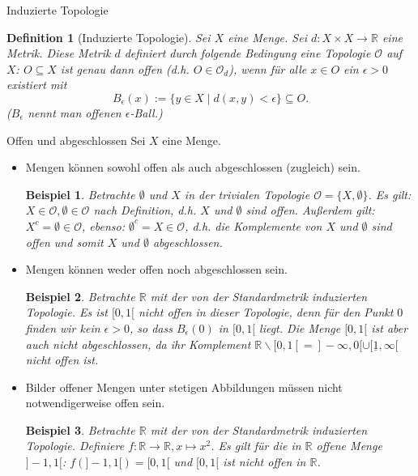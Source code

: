 \documentclass[a4paper,11pt,notitlepage]{report}
\newtheorem{definition}{Definition}[chapter]
\newtheorem{example}{Beispiel}[chapter]
\newcommand{\R}{{\ensuremath{\mathbb{R}}}}
\newcommand{\OO}{{\ensuremath{\mathcal{O}}}}
\begin{document}
\begin{section}{Induzierte Topologie}
	\begin{definition}[Induzierte Topologie]
		Sei $X$ eine Menge. Sei $d \colon X \times X \rightarrow \R$ eine Metrik. Diese Metrik $d$ definiert durch folgende Bedingung eine Topologie $\OO$ auf $X$:
		\newline
		$O \subseteq X$ ist genau dann offen (d.h. $O \in \OO_d$), wenn für alle $x \in O$ ein $\epsilon > 0$ existiert mit
		$$
			B_\epsilon (x) := \{y \in X \mid d(x,y) < \epsilon\} \subseteq O.
		$$
		($B_\epsilon$ nennt man offenen $\epsilon$-Ball.)
	\end{definition}
\end{section}

\begin{section}{Offen und abgeschlossen}
	Sei $X$ eine Menge.
	\begin{itemize}
		\item Mengen können sowohl offen als auch abgeschlossen (zugleich) sein.
			\begin{example}
				Betrachte $\emptyset$ und $X$ in der trivialen Topologie $\OO = \{X, \emptyset\}$.
					\newline
					Es gilt: $X \in \OO, \emptyset \in \OO$ nach Definition, d.h. $X$ und $\emptyset$ sind offen.
					\newline
					Außerdem gilt: $X^c = \emptyset \in \OO$, ebenso: $\emptyset^c = X \in \OO$, d.h. die Komplemente von $X$ und $\emptyset$ sind offen und somit $X$ und $\emptyset$ abgeschlossen.
			\end{example}
			
		\item Mengen können weder offen noch abgeschlossen sein.
			\begin{example}
				Betrachte $\R$ mit der von der Standardmetrik induzierten Topologie. Es ist $[0,1[$ nicht offen in dieser Topologie, denn für den Punkt $0$ finden wir kein $\epsilon > 0$, so dass $B_\epsilon(0)$ in $[0,1[$ liegt.
				Die Menge $[0,1[$ ist aber auch nicht abgeschlossen, da ihr Komplement $\R \backslash [0,1[ = ]-\infty,0[ \cup [\underline{1},\infty[$ nicht offen ist.
			\end{example}
		\item Bilder offener Mengen unter stetigen Abbildungen müssen nicht notwendigerweise offen sein.
			\begin{example}
				Betrachte $\R$ mit der von der Standardmetrik induzierten Topologie.
				\newline
				Definiere $f \colon \R \rightarrow \R, x \mapsto x^2$.
				\newline
				Es gilt für die in $\R$ offene Menge $]-1,1[$:
				\newline
				$f(]-1,1[)=[0,1[$ und $[0,1[$ ist nicht offen in $\R$.
			\end{example}
	\end{itemize}
\end{section}
\end{document}
